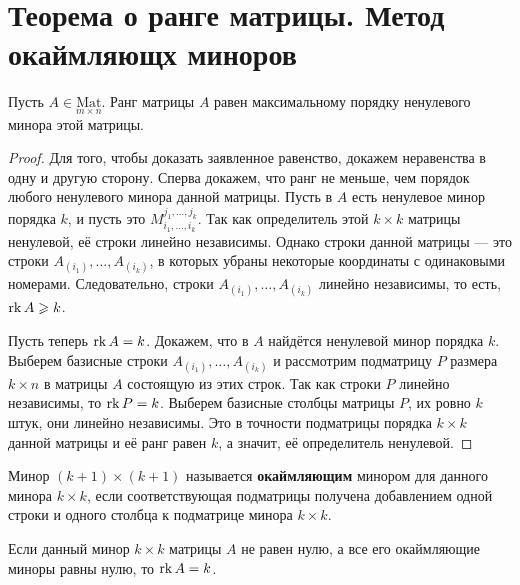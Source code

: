 \section{Теорема о ранге матрицы. Метод окаймляющх миноров}

\begin{theorem}
    Пусть $A \in \underset{m \times n}{\mathrm{Mat}}$. Ранг матрицы $A$ равен максимальному порядку ненулевого минора этой матрицы.
\end{theorem}

\begin{proof}
    Для того, чтобы доказать заявленное равенство, докажем неравенства в одну и другую сторону. Сперва докажем, что ранг не меньше, чем порядок любого ненулевого минора данной матрицы. Пусть в $A$ есть ненулевое минор порядка $k$, и пусть это $M_{i_1, \ldots, i_k}^{j_1, \ldots, j_k}$. Так как определитель этой $k \times k$ матрицы ненулевой, её строки линейно независимы. Однако строки данной матрицы --- это строки $A_{(i_1)}, \ldots, A_{(i_k)}$, в которых убраны некоторые координаты с одинаковыми номерами. Следовательно, строки $A_{(i_1)}, \ldots, A_{(i_k)}$ линейно независимы, то есть, $\mathrm{rk}\, A \geqslant k$.

    Пусть теперь $\mathrm{rk}\, A = k$. Докажем, что в $A$ найдётся ненулевой минор порядка $k$. Выберем базисные строки $A_{(i_1)}, \ldots, A_{(i_k)}$ и рассмотрим подматрицу $P$ размера $k \times n$ в матрицы $A$ состоящую из этих строк. Так как строки $P$ линейно независимы, то $\mathrm{rk}\, P = k$. Выберем базисные столбцы матрицы $P$, их ровно $k$ штук, они линейно независимы. Это в точности подматрицы порядка $k \times k$ данной матрицы и её ранг равен $k$, а значит, её определитель ненулевой.
\end{proof}

\begin{definition}
    Минор $(k + 1) \times (k + 1)$ называется \textbf{окаймляющим} минором для данного минора $k \times k$, если соответствующая подматрицы получена добавлением одной строки и одного столбца к подматрице минора $k \times k$.
\end{definition}

\begin{theorem}
    Если данный минор $k \times k$ матрицы $A$ не равен нулю, а все его окаймляющие миноры равны нулю, то $\mathrm{rk}\, A = k$.
\end{theorem}

